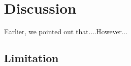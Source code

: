 \chapter{Discussion}
\label{chap:discussion}






Earlier, we pointed out that....However...

\section{Limitation}

